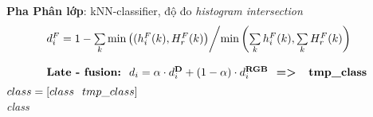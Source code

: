 \begin{algorithm}
{\begin{algorithmic}
\begin{enumerate}
			\State \textbf{Pha Phân lớp}: kNN-classifier, độ đo \textit{histogram intersection}
			\begin{equation}
				\begin{array}{l}
			d_i^F = 1 - {{\sum\limits_k {\min \left( {(h_i^F(k),H_r^F(k)} \right)} } \mathord{\left/
			 {\vphantom {{\sum\limits_k {\min \left( {(h_i^F(k),H_r^F(k)} \right)} } {\min \left( {\sum\limits_k {h_i^F(k)} ,\sum\limits_k {H_r^F(k)} } \right)}}} \right.
			 \kern-\nulldelimiterspace} {\min \left( {\sum\limits_k {h_i^F(k)} ,\sum\limits_k {H_r^F(k)} } \right)}}\\ \\
			\textbf{Late - fusion:}\hspace{0.1in}d_i = \alpha \cdot d_i^{\textbf{D}} + (1-\alpha)\cdot d_i^{\textbf{RGB}} \hspace{0.1in}\textbf{=>\hspace{0.1in} tmp\_class}
				\end{array}
			\end{equation}
			\State $class = [class\hspace{0.1in} tmp\_class]$
		\EndFor \\
		\Return \textit{class}	
	\end{enumerate}		
	\end{algorithmic}
	}
	\end{algorithm}

